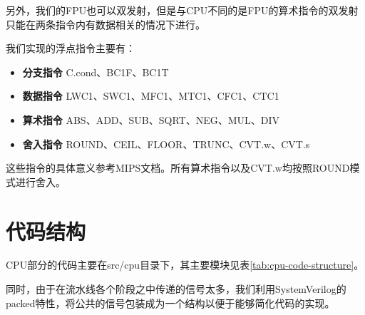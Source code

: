另外，我们的FPU也可以双发射，但是与CPU不同的是FPU的算术指令的双发射只能在两条指令内有数据相关的情况下进行。

我们实现的浮点指令主要有：
\begin{itemize}
	\item \textbf{分支指令} C.cond、BC1F、BC1T
	\item \textbf{数据指令} LWC1、SWC1、MFC1、MTC1、CFC1、CTC1
	\item \textbf{算术指令} ABS、ADD、SUB、SQRT、NEG、MUL、DIV
	\item \textbf{舍入指令} ROUND、CEIL、FLOOR、TRUNC、CVT.w、CVT.s
\end{itemize}

	这些指令的具体意义参考MIPS文档。所有算术指令以及CVT.w均按照ROUND模式进行舍入。
\section{代码结构}
CPU部分的代码主要在src/cpu目录下，其主要模块见表\ref{tab:cpu-code-structure}。

同时，由于在流水线各个阶段之中传递的信号太多，我们利用SystemVerilog的packed特性，将公共的信号包装成为一个结构以便于能够简化代码的实现。

